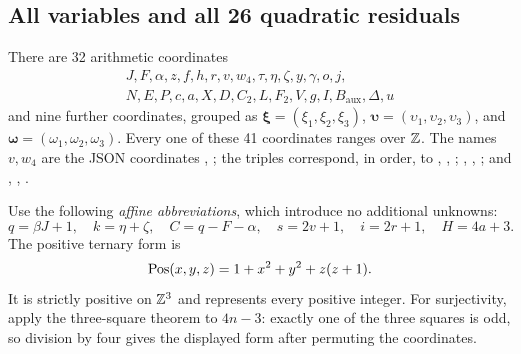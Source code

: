 \subsection{All variables and all 26 quadratic residuals}

There are 32 arithmetic coordinates
\[
\begin{gathered}
 J,F,\alpha,z,f,h,r,v,w_4,\tau,\eta,\zeta,y,\gamma,o,j,\\
 N,E,P,c,a,X,D,C_2,L,F_2,V,g,I,B_{\mathrm{aux}},\Delta,u
\end{gathered}
\]
and nine further coordinates, grouped as
\(\boldsymbol\xi=(\xi_1,\xi_2,\xi_3)\),
\(\boldsymbol\upsilon=(\upsilon_1,\upsilon_2,\upsilon_3)\), and
\(\boldsymbol\omega=(\omega_1,\omega_2,\omega_3)\).
Every one of these 41 coordinates ranges over \(\mathbb Z\).
The names \(v,w_4\) are the JSON coordinates
, ; the triples correspond, in order, to
, , ;
, , ; and
, , .

Use the following \emph{affine abbreviations}, which introduce no
additional unknowns:
\[
 q=\beta J+1,\quad k=\eta+\zeta,\quad C=q-F-\alpha,
 \quad s=2v+1,\quad i=2r+1,\quad H=4a+3.
\]
The positive ternary form is
\[
 \operatorname{Pos}(x,y,z)=1+x^2+y^2+z(z+1).
\]
It is strictly positive on \(\mathbb Z^3\) and represents every positive
integer.  For surjectivity, apply the three-square theorem to \(4n-3\):
exactly one of the three squares is odd, so division by four gives the
displayed form after permuting the coordinates.

